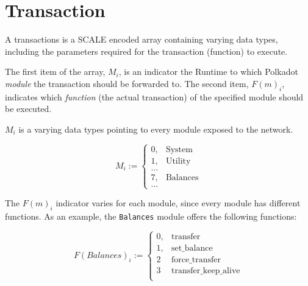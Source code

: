 \newpage
\section{Transaction}

A transactions is a SCALE encoded array containing varying data types, including
the parameters required for the transaction (function) to execute.
\newline

The first item of the array, $M_i$, is an indicator the Runtime to which
Polkadot \textit{module} the transaction should be forwarded to. The second
item, $F(m)_i$, indicates which \textit{function} (the actual transaction) of the
specified module should be executed.
\newline

$M_i$ is a varying data types pointing to every module exposed to the network.

\[
M_i :=
\begin{cases}
0, & \text{System} \\
1, & \text{Utility} \\
... & \\
7, & \text{Balances} \\
... &
\end{cases}
\]

The $F(m)_i$ indicator varies for each module, since every module has different
functions. As an example, the \verb|Balances| module offers the following
functions:

\[
F(Balances)_i :=
\begin{cases}
0, & \text{transfer} \\
1, & \text{set\_balance} \\
2 & \text{force\_transfer} \\
3 & \text{transfer\_keep\_alive} \\
\end{cases}
\]

